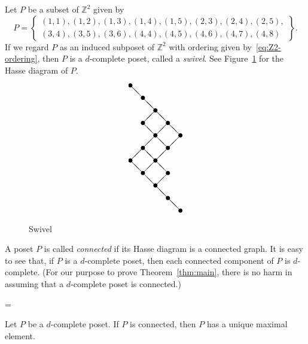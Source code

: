 \documentclass[ALCO,ThmDefs,Unicode,epreuves]{cedram}
\newcommand\Int{\mathbb{Z}}
\begin{document}
\begin{exam}
\label{ex:swivel}
Let $P$ be a subset of $\Int^2$ given by
$$
P =
\left\{ 
 \begin{array}{l}
 (1,1), (1,2), (1,3), (1,4), (1,5), (2,3), (2,4), (2,5), \\
 (3,4), (3,5), (3,6), (4,4), (4,5), (4,6), (4,7), (4,8)
 \end{array}
\right\}.
$$
If we regard $P$ as an induced subposet of $\Int^2$ with ordering given by~\eqref{eq:Z2-ordering}, 
then $P$ is a $d$-complete poset, called a \emph{swivel}.
See Figure~\ref{fig:Hasse_swivel} for the Hasse diagram of $P$.
\begin{figure}[!htb]
$$
\setlength{\unitlength}{1.5pt}
\begin{picture}(40,100)
\put(0,100){\circle*{3}}
\put(0,40){\circle*{3}}
\put(10,90){\circle*{3}}
\put(10,70){\circle*{3}}
\put(10,50){\circle*{3}}
\put(10,30){\circle*{3}}
\put(20,80){\circle*{3}}
\put(20,60){\circle*{3}}
\put(20,40){\circle*{3}}
\put(20,20){\circle*{3}}
\put(30,70){\circle*{3}}
\put(30,50){\circle*{3}}
\put(30,30){\circle*{3}}
\put(30,10){\circle*{3}}
\put(40,60){\circle*{3}}
\put(40,0){\circle*{3}}
\put(0,100){\line(1,-1){10}}
\put(0,40){\line(1,1){10}}
\put(0,40){\line(1,-1){10}}
\put(10,90){\line(1,-1){10}}
\put(10,70){\line(1,1){10}}
\put(10,70){\line(1,-1){10}}
\put(10,50){\line(1,1){10}}
\put(10,50){\line(1,-1){10}}
\put(10,30){\line(1,1){10}}
\put(10,30){\line(1,-1){10}}
\put(20,80){\line(1,-1){10}}
\put(20,60){\line(1,1){10}}
\put(20,60){\line(1,-1){10}}
\put(20,40){\line(1,1){10}}
\put(20,40){\line(1,-1){10}}
\put(20,20){\line(1,1){10}}
\put(20,20){\line(1,-1){10}}
\put(30,70){\line(1,-1){10}}
\put(30,50){\line(1,1){10}}
\put(30,10){\line(1,-1){10}}
\end{picture}
$$
\caption{Swivel}
\label{fig:Hasse_swivel}
\end{figure}
\end{exam}

A poset $P$ is called \emph{connected} if its Hasse diagram is a connected graph.
It is easy to see that, if $P$ is a $d$-complete poset, 
then each connected component of $P$ is $d$-complete.
(For our purpose to prove Theorem~\ref{thm:main}, 
there is no harm in assuming that a $d$-complete poset is connected.)

\newbox\toto
\setbox\toto=\hbox{\cite[\S~3]{Proc1}}
\begin{prop}[\box\toto]
\label{prop:dc_connected}
Let $P$ be a $d$-complete poset.
If $P$ is connected, then $P$ has a unique maximal element.
\end{prop}
\end{document}

